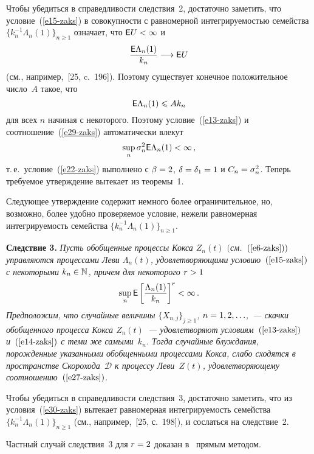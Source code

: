 \begin{multicols}{2}
\smallskip

Чтобы убедиться в справедливости следствия~2, достаточно заметить,
что условие~(\ref{e15-zaks}) в совокупности с равномерной интегрируемостью
семейства $\{k_n^{-1}\Lambda_n(1)\}_{n\geqslant1}$ означает, что ${\sf E}U\hm <\infty$ и
$$
\displaystyle\frac{\displaystyle {\sf E}\Lambda_n(1)\mathstrut}{\displaystyle k_n\mathstrut}\longrightarrow {\sf E}U
$$
(см., например,~[25, c.~196]). Поэтому существует конечное
положительное число~$A$ такое, что
\begin{equation}
{\sf E}\Lambda_n(1)\leqslant Ak_n
\label{e29-zaks}
\end{equation}
для всех $n$ начиная с некоторого. Поэтому условие~(\ref{e13-zaks}) и
соотношение~(\ref{e29-zaks}) автоматически влекут
$$
\sup\limits_n\sigma_n^2{\sf E}\Lambda_n(1)<\infty\,,
$$
т.\,е.\ условие~(\ref{e22-zaks}) выполнено с $\beta\hm=2$, $\delta\hm=\delta_1\hm=1$ и
$C_n\hm=\sigma_n^2$. Теперь требуемое утверждение вытекает из теоремы~1.

\smallskip

Следующее утверждение содержит немного более ограничительное, но,
возможно, более удобно проверяемое условие, нежели равномерная
интегрируемость семейства $\{k_n^{-1}\Lambda_n(1)\}_{n\geqslant1}$.

\smallskip

\noindent
\textbf{Следствие 3.} \textit{Пусть обобщенные процессы Кокса $Z_n(t)$
$($см.~$(\ref{e6-zaks}))$ управляются процессами Леви $\Lambda_n(t)$,
удовлетворяющими условию~$(\ref{e15-zaks})$ с некоторыми $k_n\hm\in\mathbb{N}$,
причем для некоторого $r\hm>1$
\begin{equation}
\sup_n{\sf E}\left[\displaystyle\frac{\displaystyle \Lambda_n(1)\mathstrut}{\displaystyle k_n\mathstrut}\right]^r<\infty\,.\label{e30-zaks}
\end{equation}
Предположим, что случайные величины $\{X_{n,j}\}_{j\geqslant1}$,
$n\hm=1,2,\ldots$,~--- скачки обобщенного процесса Кокса $Z_n(t)$~---
удовлетворяют условиям~$(\ref{e13-zaks})$ и~$(\ref{e14-zaks})$ с теми же самыми~$k_n$. Тогда
случайные блуждания, порожденные указанными обобщенными процессами
Кокса, слабо сходятся в пространстве Скорохода~$\mathcal{D}$ к
процессу Леви~$Z(t)$, удовлетворяющему соотношению~$(\ref{e27-zaks})$.}

\smallskip

Чтобы убедиться в справедливости следствия~3, достаточно заметить,
что из условия~(\ref{e30-zaks}) вытекает равномерная интегрируемость семейства
$\{k_n^{-1}\Lambda_n(1)\}_{n\geqslant1}$ (см., например,~[25, с.~198]), и
сослаться на следствие~2.

Частный случай следствия~3 для $r\hm=2$ доказан в~\cite{Kashcheev2000, Kashcheev2001} прямым методом.


\end{multicols}
